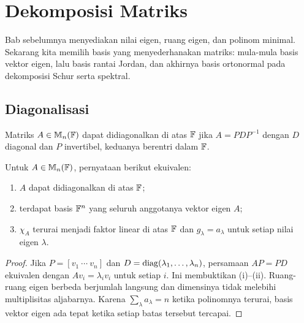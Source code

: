 \chapter{Dekomposisi Matriks}
\label{ch:dekomposisi}

Bab sebelumnya menyediakan nilai eigen, ruang eigen, dan polinom minimal.
Sekarang kita memilih basis yang menyederhanakan matriks: mula-mula
basis vektor eigen, lalu basis rantai Jordan, dan akhirnya basis
ortonormal pada dekomposisi Schur serta spektral.

\section{Diagonalisasi}
\label{eigen:diagonalisasi}

\begin{definisi}
    Matriks $A\in\mathbb{M}_n(\mathbb{F})$ dapat didiagonalkan di atas $\mathbb{F}$ jika
    $A=PDP^{-1}$ dengan $D$ diagonal dan $P$ invertibel, keduanya
    berentri dalam $\mathbb{F}$.
\end{definisi}

\begin{teorema}
    Untuk $A\in\mathbb{M}_n(\mathbb{F})$, pernyataan berikut ekuivalen:
    \begin{enumerate}[label=(\roman*),nosep]
        \item $A$ dapat didiagonalkan di atas $\mathbb{F}$;
        \item terdapat basis $\mathbb{F}^n$ yang seluruh anggotanya vektor eigen $A$;
        \item $\chi_A$ terurai menjadi faktor linear di atas $\mathbb{F}$ dan
            $g_\lambda=a_\lambda$ untuk setiap nilai eigen $\lambda$.
    \end{enumerate}
\end{teorema}
\begin{proof}
    Jika $P=[v_1\ \cdots\ v_n]$ dan
    $D=\operatorname{diag}(\lambda_1,\ldots,\lambda_n)$, persamaan $AP=PD$
    ekuivalen dengan $Av_i=\lambda_iv_i$ untuk setiap $i$.
    Ini membuktikan (i)--(ii).
    Ruang-ruang eigen berbeda berjumlah langsung dan dimensinya
    tidak melebihi multiplisitas aljabarnya.
    Karena $\sum_\lambda a_\lambda=n$ ketika polinomnya terurai,
    basis vektor eigen ada tepat ketika setiap batas tersebut tercapai.
\end{proof}

